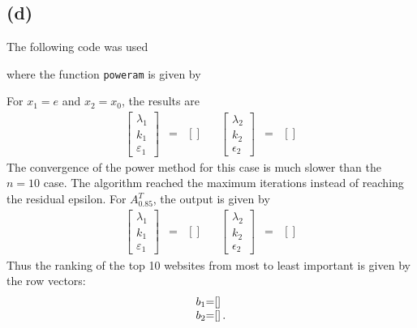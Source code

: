 \documentclass[11pt]{article}
\theoremstyle{definition}
\theoremstyle{remark}
\theoremstyle{plain}
\begin{document}
\subsection*{(d)}
The following code was used

where the function \texttt{poweram} is given by

For $x_1=e$ and $x_2=x_0$, the results are
\begin{equation*}
  \begin{array}{rclcrcl}
    \left[\begin{array}{c}
            \lambda_1\\
            k_1\\
            \varepsilon_1
          \end{array}
    \right]
 &=&\left[\right]&&\left[\begin{array}{c}
                                             \lambda_2\\
                                             k_2\\
                                             \epsilon_2
                                           \end{array}
    \right]&=&\left[\right]
  \end{array}
\end{equation*}
The convergence of the power method for this case is much slower than the $n=10$ case. The algorithm reached the maximum iterations instead of reaching the residual epsilon.
For $A_{0.85}^T$, the output is given by
\begin{equation*}
  \begin{array}{rclcrcl}
    \left[\begin{array}{c}
            \lambda_1\\
            k_1\\
            \varepsilon_1
          \end{array}
    \right]
 &=&\left[\right]&&\left[\begin{array}{c}
                                             \lambda_2\\
                                             k_2\\
                                             \epsilon_2
                                           \end{array}
    \right]&=&\left[\right]
  \end{array}
\end{equation*}
Thus the ranking of the top 10  websites from most to least important is given by the row vectors:
\begin{equation*}
  \begin{array}{r@{\hspace{0cm}}c@{\hspace{0cm}}l}
    b_1&=&\left[\right]\\
    b_2&=&\left[\right].
  \end{array}
\end{equation*}
\end{document}
